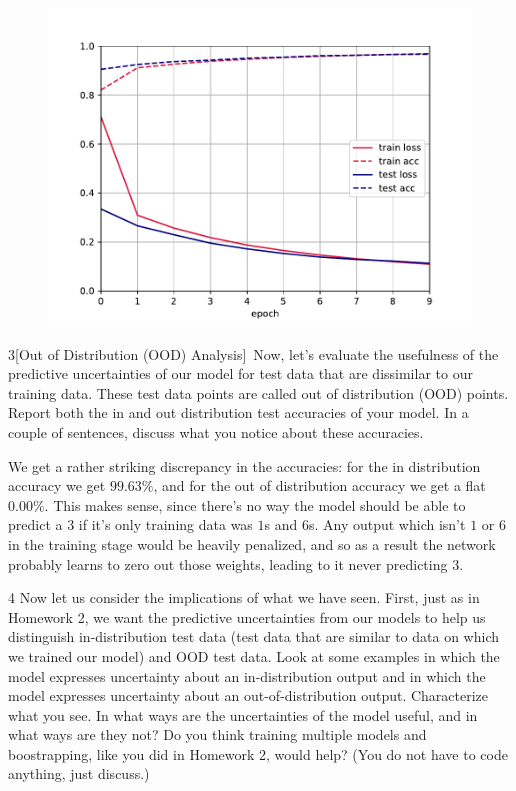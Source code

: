 \documentclass[expanded]{lkx_pset}
\begin{document}
\begin{parts}
	\begin{figure}[ht]
		\centering
		\includegraphics[]{loss_plot.pdf}
	\end{figure}

	\begin{part}{3}[Out of Distribution (OOD) Analysis]$\,$
		Now, let's evaluate the usefulness of the predictive uncertainties of our model for test data that are dissimilar to our training data. These test data points are called out of distribution (OOD) points. Report both the in and out distribution test accuracies of your model. In a couple of sentences, discuss what you notice about these accuracies.
	\end{part}

	We get a rather striking discrepancy in the accuracies: for the in distribution accuracy we get $99.63\%$, and for the out of distribution accuracy we get a flat $0.00\%$. This makes sense, since there's no way the model should be able to predict a $3$ if it's only training data was $1$s and $6$s. Any output which isn't $1$ or $6$ in the training stage would be heavily penalized, and so as a result the network probably learns to zero out those weights, leading to it never predicting $3$.

	\begin{part}{4}
		Now let us consider the implications of what we have seen.  First, just as in Homework 2, we want the predictive uncertainties from our models to help us distinguish in-distribution test data (test data that are similar to data on which we trained our model) and OOD test data.  Look at some examples in which the model expresses uncertainty about an in-distribution output and in which the model expresses uncertainty about an out-of-distribution output.  Characterize what you see.  In what ways are the uncertainties of the model useful, and in what ways are they not?  Do you think training multiple models and boostrapping, like you did in Homework 2, would help?  (You do not have to code anything, just discuss.)
	\end{part}


\end{parts}
\end{document}
